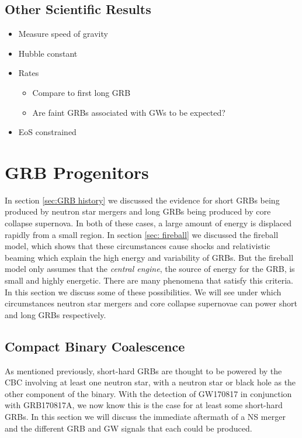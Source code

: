 \documentclass[11pt]{cuthesis}
\begin{document}
\subsection{Other Scientific Results}
\begin{itemize}
\item Measure speed of gravity
\item Hubble constant
\item Rates
\begin{itemize}
\item Compare to first long GRB
\item Are faint GRBs associated with GWs to be expected?
\end{itemize}%
\item EoS constrained
\end{itemize}






\section{GRB Progenitors} \label{sec: grb prog}
In section \ref{sec:GRB history} we discussed the evidence for short GRBs being produced by neutron star mergers and long GRBs being produced by core collapse supernova. In both of these cases, a large amount of energy is displaced rapidly from a small region. In section \ref{sec: fireball} we discussed  the fireball model, which shows that these circumstances cause shocks and relativistic beaming which explain the high energy and variability of GRBs. But the fireball model only assumes that the \textit{central engine}, the source of energy for the GRB, is small and highly energetic. There are many phenomena that satisfy this criteria. In this section we discuss some of these possibilities. We will see under which circumstances neutron star mergers and core collapse supernovae can power short and long GRBs respectively.

\subsection{Compact Binary Coalescence}
As mentioned previously, short-hard GRBs are thought to be powered by the CBC involving at least one neutron star, with a neutron star or black hole as the other component of the binary. With the detection of GW170817 in conjunction with GRB170817A, we now know this is the case for at least some short-hard GRBs. In this section we will discuss the immediate aftermath of a NS merger and the different GRB and GW signals that each could be produced.
\end{document}
